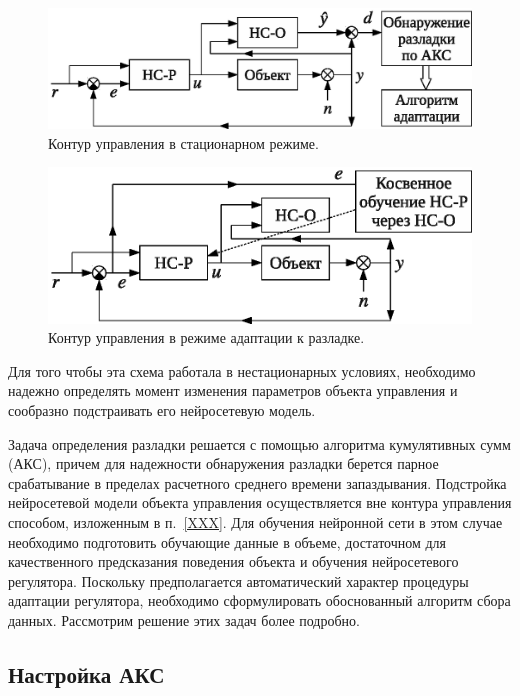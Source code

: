 \begin{figure}[h]
\centering
\includegraphics{steady_state_rus}
\caption{Контур управления в стационарном режиме.}
\label{fig:steady_state_loop}
\end{figure}

\begin{figure}[h]
\centering
\includegraphics{modified_adoption_rus}
\caption{Контур управления в режиме адаптации к разладке.}
\label{fig:modified_adoption_loop}
\end{figure}

Для того чтобы эта схема работала в нестационарных условиях,
необходимо надежно определять момент изменения параметров объекта
управления и сообразно подстраивать его нейросетевую модель.

Задача определения разладки решается с помощью алгоритма кумулятивных
сумм (АКС), причем для надежности обнаружения разладки берется парное
срабатывание в пределах расчетного среднего времени запаздывания.
Подстройка нейросетевой модели объекта управления осуществляется вне
контура управления способом, изложенным в п.~\ref{XXX}.  Для обучения
нейронной сети в этом случае необходимо подготовить обучающие данные в
объеме, достаточном для качественного предсказания поведения объекта и
обучения нейросетевого регулятора.  Поскольку предполагается
автоматический характер процедуры адаптации регулятора, необходимо
сформулировать обоснованный алгоритм сбора данных.  Рассмотрим решение
этих задач более подробно.

\subsection{Настройка АКС}


